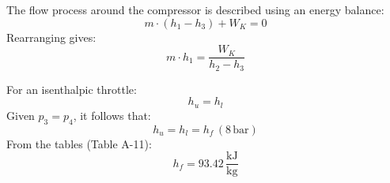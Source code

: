 The flow process around the compressor is described using an energy balance:  
\[
m \cdot (h_1 - h_3) + W_K = 0
\]  
Rearranging gives:  
\[
m \cdot h_1 = \frac{W_K}{h_2 - h_3}
\]  

For an isenthalpic throttle:  
\[
h_u = h_l
\]  
Given \(p_3 = p_4\), it follows that:  
\[
h_u = h_l = h_f \, (8 \, \text{bar})
\]  
From the tables (Table A-11):  
\[
h_f = 93.42 \, \frac{\text{kJ}}{\text{kg}}
\]